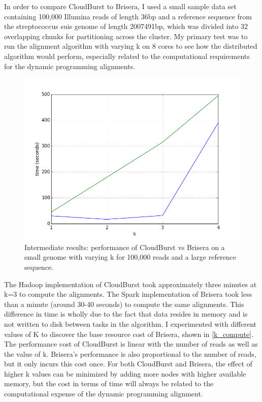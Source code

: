\documentclass[conference,letterpaper,11pt]{IEEEtran}
\begin{document}
	In order to compare CloudBurst to Brisera, I used a small sample data set containing 100,000 Illumina reads of length 36bp and a reference sequence from the streptococcus suis genome of length 2007491bp, which was divided into 32 overlapping chunks for partitioning across the cluster. My primary test was to run the alignment algorithm with varying k on 8 cores to see how the distributed algorithm would perform, especially related to the computational requirements for the dynamic programming alignments. 

	\begin{figure}[!hbt]
		\begin{center}
		\includegraphics[width=\columnwidth]{figure_1}
		\caption{Intermediate results: performance of CloudBurst vs Brisera on a small genome with varying k for 100,000 reads and a large reference sequence.}
		\label{fig:k_compute}
		\end{center}
	\end{figure}

	The Hadoop implementation of CloudBurst took approximately three minutes at k=3 to compute the alignments. The Spark implementation of Brisera took less than a minute (around 30-40 seconds) to compute the same alignments. This difference in time is wholly due to the fact that data resides in memory and is not written to disk between tasks in the algorithm. I experimented with different values of K to discover the base resource cost of Brisera, shown in \ref{k_compute}. The performance cost of CloudBurst is linear with the number of reads as well as the value of k. Brisera's performance is also proportional to the number of reads, but it only incurs this cost once. For both CloudBurst and Brisera, the effect of higher k values can be minimized by adding more nodes with higher available memory, but the cost in terms of time will always be related to the computational expense of the dynamic programming alignment. 
    
\end{document}
